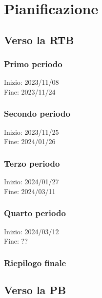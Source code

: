 \pagebreak
\section{Pianificazione}

\subsection{Verso la RTB}

\subsubsection{Primo periodo}
Inizio: 2023/11/08 \\
Fine: 2023/11/24 \\



\subsubsection{Secondo periodo}
Inizio: 2023/11/25 \\
Fine: 2024/01/26 \\



\subsubsection{Terzo periodo}
Inizio: 2024/01/27 \\
Fine: 2024/03/11 \\



\subsubsection{Quarto periodo}
Inizio: 2024/03/12 \\
Fine: ?? \\



\subsubsection{Riepilogo finale}


\pagebreak
\subsection{Verso la PB}
